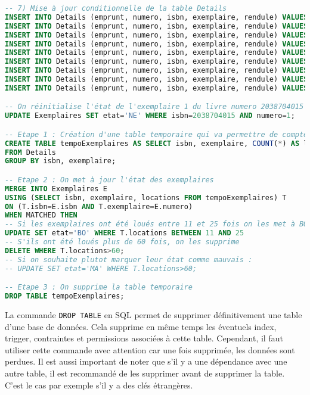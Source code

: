 \documentclass[10pt, oneside]{article}
\begin{document}
\begin{lstlisting}[language=sql, title=Question 7, label=QII7]
-- 7) Mise à jour conditionnelle de la table Details
INSERT INTO Details (emprunt, numero, isbn, exemplaire, rendule) VALUES (7, 2, 2038704015, 1, SYSDATE-136);
INSERT INTO Details (emprunt, numero, isbn, exemplaire, rendule) VALUES (8, 2, 2038704015, 1, SYSDATE-127);
INSERT INTO Details (emprunt, numero, isbn, exemplaire, rendule) VALUES (11, 2, 2038704015, 1, SYSDATE-95);
INSERT INTO Details (emprunt, numero, isbn, exemplaire, rendule) VALUES (15, 2, 2038704015, 1, SYSDATE-54);
INSERT INTO Details (emprunt, numero, isbn, exemplaire, rendule) VALUES (16, 3, 2038704015, 1, SYSDATE-43);
INSERT INTO Details (emprunt, numero, isbn, exemplaire, rendule) VALUES (17, 2, 2038704015, 1, SYSDATE-36);
INSERT INTO Details (emprunt, numero, isbn, exemplaire, rendule) VALUES (18, 2, 2038704015, 1, SYSDATE-24);
INSERT INTO Details (emprunt, numero, isbn, exemplaire, rendule) VALUES (19, 2, 2038704015, 1, SYSDATE-13);
INSERT INTO Details (emprunt, numero, isbn, exemplaire, rendule) VALUES (20, 3, 2038704015, 1, SYSDATE-3);

-- On réinitialise l'état de l'exemplaire 1 du livre numero 2038704015
UPDATE Exemplaires SET etat='NE' WHERE isbn=2038704015 AND numero=1;

-- Etape 1 : Création d'une table temporaire qui va permettre de compter le nombre de locations de chaque exemplaire
CREATE TABLE tempoExemplaires AS SELECT isbn, exemplaire, COUNT(*) AS locations 
FROM Details
GROUP BY isbn, exemplaire;

-- Etape 2 : On met à jour l'état des exemplaires
MERGE INTO Exemplaires E
USING (SELECT isbn, exemplaire, locations FROM tempoExemplaires) T 
ON (T.isbn=E.isbn AND T.exemplaire=E.numero)
WHEN MATCHED THEN
-- Si les exemplaires ont été loués entre 11 et 25 fois on les met à BO (Bon)
UPDATE SET etat='BO' WHERE T.locations BETWEEN 11 AND 25
-- S'ils ont été loués plus de 60 fois, on les supprime
DELETE WHERE T.locations>60;
-- Si on souhaite plutot marquer leur état comme mauvais : 
-- UPDATE SET etat='MA' WHERE T.locations>60;

-- Etape 3 : On supprime la table temporaire
DROP TABLE tempoExemplaires;
\end{lstlisting}

La commande \texttt{DROP TABLE} en SQL permet de supprimer définitivement une table d'une base de données. Cela supprime en même temps les éventuels index, trigger, contraintes et permissions associées à cette table. Cependant, il faut utiliser cette commande avec attention car une fois supprimée, les données sont perdues. Il est aussi important de noter que s'il y a une dépendance avec une autre table, il est recommandé de les supprimer avant de supprimer la table. C'est le cas par exemple s'il y a des clés étrangères.
\end{document}
